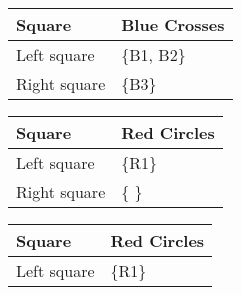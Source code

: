 \documentclass[letterpaper,11pt,english]{sphinxmanual}
\begin{document}
\begin{savenotes}\sphinxattablestart
\centering
{}
\label{\detokenize{concept:id48}}\label{\detokenize{concept:tableiiia}}
\sphinxaftercaption
\begin{tabulary}{\linewidth}[t]{|T|T|}
\hline
\sphinxstyletheadfamily 
Square
&\sphinxstyletheadfamily 
Blue Crosses
\\
\hline
Left square
&
\{B1, B2\}
\\
\hline
Right square
&
\{B3\}
\\
\hline
\end{tabulary}
\par
\sphinxattableend\end{savenotes}


\begin{savenotes}\sphinxattablestart
\centering
{}
\label{\detokenize{concept:id49}}\label{\detokenize{concept:tableiiib}}
\sphinxaftercaption
\begin{tabulary}{\linewidth}[t]{|T|T|}
\hline
\sphinxstyletheadfamily 
Square
&\sphinxstyletheadfamily 
Red Circles
\\
\hline
Left square
&
\{R1\}
\\
\hline
Right square
&
\{  \}
\\
\hline
\end{tabulary}
\par
\sphinxattableend\end{savenotes}


\begin{savenotes}\sphinxattablestart
\centering
{}
\label{\detokenize{concept:id50}}\label{\detokenize{concept:tableiiic}}
\sphinxaftercaption
\begin{tabulary}{\linewidth}[t]{|T|T|}
\hline
\sphinxstyletheadfamily 
Square
&\sphinxstyletheadfamily 
Red Circles
\\
\hline
Left square
&
\{R1\}
\\
\hline
\end{tabulary}
\par
\sphinxattableend\end{savenotes}
\end{document}
